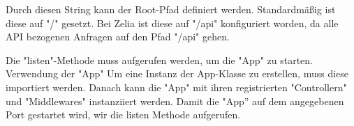 
Durch diesen String kann der Root-Pfad definiert werden. Standardmäßig ist diese auf "/" gesetzt. Bei Zelia ist diese auf "/api" konfiguriert worden, da alle API bezogenen Anfragen auf den Pfad "/api" gehen.

Die "listen"-Methode muss aufgerufen werden, um die "App" zu starten.
Verwendung der "App"
Um eine Instanz der App-Klasse zu erstellen, muss diese importiert werden. Danach kann die "App" mit ihren registrierten "Controllern" und "Middlewares" instanziiert werden. Damit die "App” auf dem angegebenen Port gestartet wird, wir die listen Methode aufgerufen.

